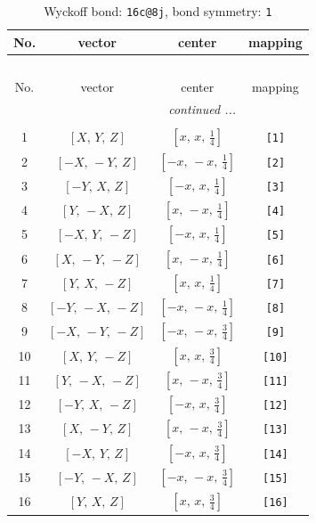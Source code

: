 \documentclass[fleqn,8pt]{jsarticle}
\begin{document}
\begin{longtable}{cccc}
\caption{Wyckoff bond: {\tt 16c@8j}, bond symmetry: {\tt 1}}
 \\
 \hline \hline
No. & vector & center & mapping \\ \hline \endfirsthead

\multicolumn{3}{l}{\tablename\ \thetable{}} \\
 \hline \hline
No. & vector & center & mapping \\ \hline \endhead

 \hline \hline
\multicolumn{3}{r}{\footnotesize\it continued ...} \\ \endfoot

 \hline \hline
\multicolumn{3}{r}{} \\ \endlastfoot

1 & $\left[ X,\, Y,\, Z \right]$ & $\left[ x,\, x,\, \frac{1}{4} \right]$ & {\tt [1]} \\ \hline
2 & $\left[ - X,\, - Y,\, Z \right]$ & $\left[ - x,\, - x,\, \frac{1}{4} \right]$ & {\tt [2]} \\ \hline
3 & $\left[ - Y,\, X,\, Z \right]$ & $\left[ - x,\, x,\, \frac{1}{4} \right]$ & {\tt [3]} \\ \hline
4 & $\left[ Y,\, - X,\, Z \right]$ & $\left[ x,\, - x,\, \frac{1}{4} \right]$ & {\tt [4]} \\ \hline
5 & $\left[ - X,\, Y,\, - Z \right]$ & $\left[ - x,\, x,\, \frac{1}{4} \right]$ & {\tt [5]} \\ \hline
6 & $\left[ X,\, - Y,\, - Z \right]$ & $\left[ x,\, - x,\, \frac{1}{4} \right]$ & {\tt [6]} \\ \hline
7 & $\left[ Y,\, X,\, - Z \right]$ & $\left[ x,\, x,\, \frac{1}{4} \right]$ & {\tt [7]} \\ \hline
8 & $\left[ - Y,\, - X,\, - Z \right]$ & $\left[ - x,\, - x,\, \frac{1}{4} \right]$ & {\tt [8]} \\ \hline
9 & $\left[ - X,\, - Y,\, - Z \right]$ & $\left[ - x,\, - x,\, \frac{3}{4} \right]$ & {\tt [9]} \\ \hline
10 & $\left[ X,\, Y,\, - Z \right]$ & $\left[ x,\, x,\, \frac{3}{4} \right]$ & {\tt [10]} \\ \hline
11 & $\left[ Y,\, - X,\, - Z \right]$ & $\left[ x,\, - x,\, \frac{3}{4} \right]$ & {\tt [11]} \\ \hline
12 & $\left[ - Y,\, X,\, - Z \right]$ & $\left[ - x,\, x,\, \frac{3}{4} \right]$ & {\tt [12]} \\ \hline
13 & $\left[ X,\, - Y,\, Z \right]$ & $\left[ x,\, - x,\, \frac{3}{4} \right]$ & {\tt [13]} \\ \hline
14 & $\left[ - X,\, Y,\, Z \right]$ & $\left[ - x,\, x,\, \frac{3}{4} \right]$ & {\tt [14]} \\ \hline
15 & $\left[ - Y,\, - X,\, Z \right]$ & $\left[ - x,\, - x,\, \frac{3}{4} \right]$ & {\tt [15]} \\ \hline
16 & $\left[ Y,\, X,\, Z \right]$ & $\left[ x,\, x,\, \frac{3}{4} \right]$ & {\tt [16]} \\
\end{longtable}
\end{document}
